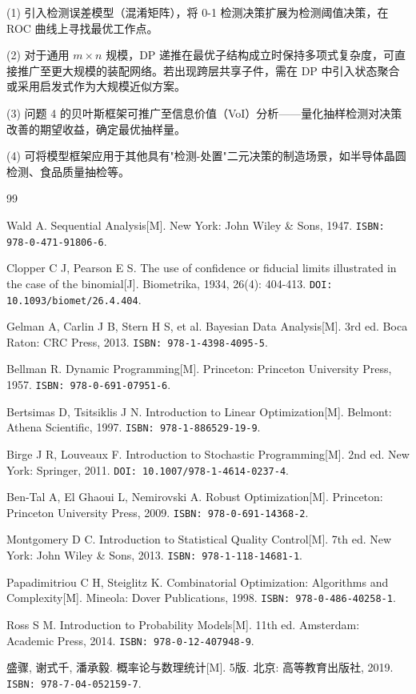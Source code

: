 \documentclass[12pt,a4paper]{ctexart}
\begin{document}
(1) 引入检测误差模型（混淆矩阵），将 0-1 检测决策扩展为检测阈值决策，在 ROC 曲线上寻找最优工作点。

(2) 对于通用 $m\times n$ 规模，DP 递推在最优子结构成立时保持多项式复杂度，可直接推广至更大规模的装配网络。若出现跨层共享子件，需在 DP 中引入状态聚合或采用启发式作为大规模近似方案。

(3) 问题 4 的贝叶斯框架可推广至信息价值（VoI）分析——量化抽样检测对决策改善的期望收益，确定最优抽样量。

(4) 可将模型框架应用于其他具有"检测-处置"二元决策的制造场景，如半导体晶圆检测、食品质量抽检等。

\begin{thebibliography}{99}

 Wald A. Sequential Analysis[M]. New York: John Wiley \& Sons, 1947. \texttt{ISBN: 978-0-471-91806-6}.

 Clopper C J, Pearson E S. The use of confidence or fiducial limits illustrated in the case of the binomial[J]. Biometrika, 1934, 26(4): 404-413. \texttt{DOI: 10.1093/biomet/26.4.404}.

 Gelman A, Carlin J B, Stern H S, et al. Bayesian Data Analysis[M]. 3rd ed. Boca Raton: CRC Press, 2013. \texttt{ISBN: 978-1-4398-4095-5}.

 Bellman R. Dynamic Programming[M]. Princeton: Princeton University Press, 1957. \texttt{ISBN: 978-0-691-07951-6}.

 Bertsimas D, Tsitsiklis J N. Introduction to Linear Optimization[M]. Belmont: Athena Scientific, 1997. \texttt{ISBN: 978-1-886529-19-9}.

 Birge J R, Louveaux F. Introduction to Stochastic Programming[M]. 2nd ed. New York: Springer, 2011. \texttt{DOI: 10.1007/978-1-4614-0237-4}.

 Ben-Tal A, El Ghaoui L, Nemirovski A. Robust Optimization[M]. Princeton: Princeton University Press, 2009. \texttt{ISBN: 978-0-691-14368-2}.

 Montgomery D C. Introduction to Statistical Quality Control[M]. 7th ed. New York: John Wiley \& Sons, 2013. \texttt{ISBN: 978-1-118-14681-1}.

 Papadimitriou C H, Steiglitz K. Combinatorial Optimization: Algorithms and Complexity[M]. Mineola: Dover Publications, 1998. \texttt{ISBN: 978-0-486-40258-1}.

 Ross S M. Introduction to Probability Models[M]. 11th ed. Amsterdam: Academic Press, 2014. \texttt{ISBN: 978-0-12-407948-9}.

 盛骤, 谢式千, 潘承毅. 概率论与数理统计[M]. 5版. 北京: 高等教育出版社, 2019. \texttt{ISBN: 978-7-04-052159-7}.

\end{thebibliography}
\end{document}

